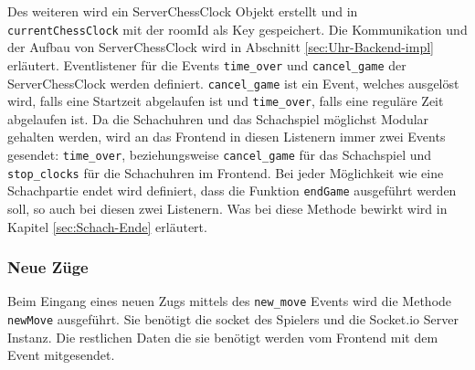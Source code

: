 Des weiteren wird ein ServerChessClock Objekt erstellt und in \verb|currentChessClock| mit der roomId als Key gespeichert. Die Kommunikation und der Aufbau von ServerChessClock wird in Abschnitt \ref{sec:Uhr-Backend-impl} erläutert.
Eventlistener für die Events \verb|time_over| und \verb|cancel_game| der ServerChessClock werden definiert. \verb|cancel_game| ist ein Event, welches ausgelöst wird, falls eine Startzeit abgelaufen ist und \verb|time_over|, falls eine reguläre Zeit abgelaufen ist.
Da die Schachuhren und das Schachspiel möglichst Modular gehalten werden, wird an das Frontend in diesen Listenern immer zwei Events gesendet: \verb|time_over|, beziehungsweise \verb|cancel_game| für das Schachspiel und \verb|stop_clocks| für die Schachuhren im Frontend. Bei jeder Möglichkeit wie eine Schachpartie endet wird definiert, dass die Funktion \verb|endGame| ausgeführt werden soll, so auch bei diesen zwei Listenern. Was bei diese Methode bewirkt wird in Kapitel \ref{sec:Schach-Ende} erläutert.

\subsubsection{Neue Züge}
\label{sec:new_move_backend}
Beim Eingang eines neuen Zugs mittels des \verb|new_move| Events wird die Methode \verb|newMove| ausgeführt. Sie benötigt die socket des Spielers und die Socket.io Server Instanz. Die restlichen Daten die sie benötigt werden vom Frontend mit dem Event mitgesendet.

